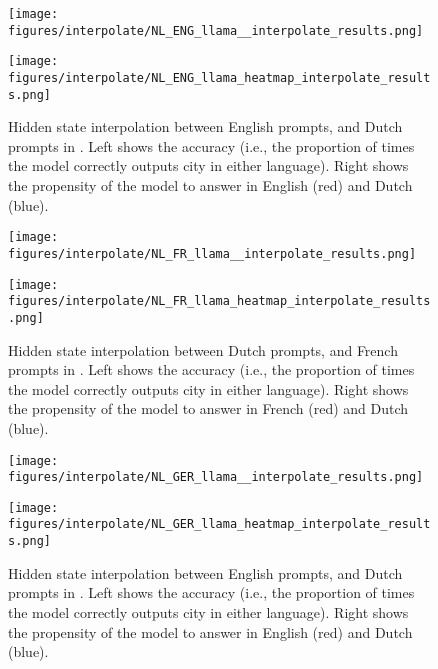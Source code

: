 \begin{figure}[h]
\begin{minipage}{0.49\textwidth}
    \centering
    \texttt{[image: figures/interpolate/NL\_ENG\_llama\_\_interpolate\_results.png]} 
\end{minipage}
\begin{minipage}{0.49\textwidth}
    \centering
    \texttt{[image: figures/interpolate/NL\_ENG\_llama\_heatmap\_interpolate\_results.png]} 
\end{minipage}
\caption{Hidden state interpolation between English prompts, and Dutch prompts in \llama. Left shows the accuracy (i.e., the proportion of times the model correctly outputs city in either language). Right shows the propensity of the model to answer in English (red) and Dutch (blue). }
\end{figure}


\begin{figure}[h]
\begin{minipage}{0.49\textwidth}
    \centering
    \texttt{[image: figures/interpolate/NL\_FR\_llama\_\_interpolate\_results.png]} 
\end{minipage}
\begin{minipage}{0.49\textwidth}
    \centering
    \texttt{[image: figures/interpolate/NL\_FR\_llama\_heatmap\_interpolate\_results.png]} 
\end{minipage}
\caption{Hidden state interpolation between Dutch prompts, and French prompts in \llama. Left shows the accuracy (i.e., the proportion of times the model correctly outputs city in either language). Right shows the propensity of the model to answer in French (red) and Dutch (blue). }
\end{figure}


\begin{figure}[h]
\begin{minipage}{0.49\textwidth}
    \centering
    \texttt{[image: figures/interpolate/NL\_GER\_llama\_\_interpolate\_results.png]} 
\end{minipage}
\begin{minipage}{0.49\textwidth}
    \centering
    \texttt{[image: figures/interpolate/NL\_GER\_llama\_heatmap\_interpolate\_results.png]} 
\end{minipage}
\caption{Hidden state interpolation between English prompts, and Dutch prompts in \llama. Left shows the accuracy (i.e., the proportion of times the model correctly outputs city in either language). Right shows the propensity of the model to answer in English (red) and Dutch (blue). }
\end{figure}

